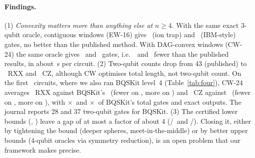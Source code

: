 \paragraph{Findings.} (1) \emph{Convexity matters more than anything else at $n\ge4$.} With the same exact 3-qubit
oracle, contiguous windows (EW-16) give \EWFourIon\ (ion trap) and \EWFourIbm\ (IBM-style) gates, no better than the
published method. With DAG-convex windows (CW-24) the same oracle gives \CWFourIon\ and \CWFourIbm\ gates, i.e.\
\FourImprovementIon\ and \FourImprovementIbm\ fewer than the published results, in about \CWFourSec\,s per circuit. (2)
Two-qubit counts drop from 43 (published) to \CWFourIonTwoQ\ RXX and \CWFourIbmTwoQ\ CZ, although CW optimises
total length, not two-qubit count. On the first \CWBqIonN\ circuits, where we also ran BQSKit level~4
(Table~\ref{tab:four}), CW-24 averages \CWBqIonTwoQ\ RXX against BQSKit's \BqFourIonTwoQ\ (fewer on \CWBqIonFewer, more
on \CWBqIonMore) and \CWBqIbmTwoQ\ CZ against \BqFourIbmTwoQ\ (fewer on \CWBqIbmFewer, more on \CWBqIbmMore), with
$\times$\CWBqIonTotalRatio\ and $\times$\CWBqIbmTotalRatio\ of BQSKit's total gates and exact outputs. The journal
reports 28 and 37 two-qubit gates for BQSKit. (3) The certified lower bounds
(\LBFourIon, \LBFourIbm) leave a gap of at most a factor of about 4 (\NjpIonCliff/\LBFourIon\ and \NjpIbmCliff/\LBFourIbm). Closing it, either by tightening the bound (deeper spheres,
meet-in-the-middle) or by better upper bounds (4-qubit oracles via symmetry reduction), is an open problem that our framework
makes precise.
